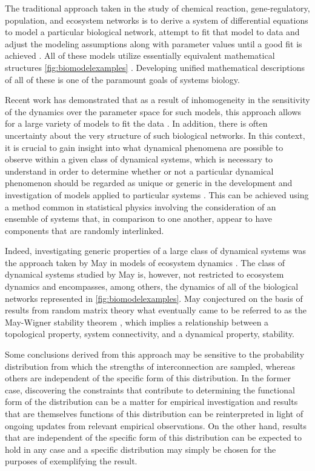 The traditional approach taken in the study of chemical reaction, gene-regulatory, population, and ecosystem networks is to derive a system of differential equations to model a particular biological network, attempt to fit that model to data and adjust the modeling assumptions along with parameter values until a good fit is achieved \cite{Meyer2014}. All of these models utilize essentially equivalent mathematical structures \ref{fig:biomodelexamples} \cite{RossCr2003,Alon2006,Palsson2006,HamidBolouri2008,Palsson2011a,Voit2012,Sauro2012}. Developing unified mathematical descriptions of all of these is one of the paramount goals of systems biology.

Recent work has demonstrated that as a result of inhomogeneity in the sensitivity of the dynamics over the parameter space for such models, this approach allows for a large variety of models to fit the data \cite{Brown2003,Gutenkunst2007,Daniels2008a,Machta2013,Hines2014,Prabakaran2014,Tonsing2014}. In addition, there is often uncertainty about the very structure of such biological networks. In this context, it is crucial to gain insight into what dynamical phenomena are possible to observe within a given class of dynamical systems, which is necessary to understand in order to determine whether or not a particular dynamical phenomenon should be regarded as unique or generic in the development and investigation of models applied to particular systems \cite{Gunawardena2013,Gunawardena2014}. This can be achieved using a method common in statistical physics involving the consideration of an ensemble of systems that, in comparison to one another, appear to have components that are randomly interlinked.

Indeed, investigating generic properties of a large class of dynamical systems was the approach taken by May in models of ecosystem dynamics \cite{Gardner1970,May1972}. The class of dynamical systems studied by May is, however, not restricted to ecosystem dynamics and encompasses, among others, the dynamics of all of the biological networks represented in \ref{fig:biomodelexamples}. May conjectured on the basis of results from random matrix theory what eventually came to be referred to as the May-Wigner stability theorem \cite{Cohen1984,May1972a,Radius2014,Majumdar2014}, which implies a relationship between a topological property, system connectivity, and a dynamical property, stability.

Some conclusions derived from this approach may be sensitive to the probability distribution from which the strengths of interconnection are sampled, whereas others are independent of the specific form of this distribution. In the former case, discovering the constraints that contribute to determining the functional form of the distribution can be a matter for empirical investigation and results that are themselves functions of this distribution can be reinterpreted in light of ongoing updates from relevant empirical observations. On the other hand, results that are independent of the specific form of this distribution can be expected to hold in any case and a specific distribution may simply be chosen for the purposes of exemplifying the result.

